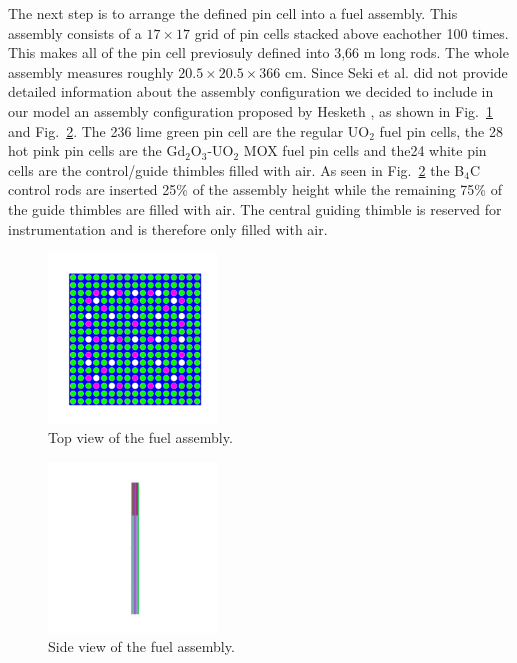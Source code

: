 \documentclass[twocolumn,a4paper,10pt]{article}
\begin{document}
\par
The next step is to arrange the defined pin cell into a fuel assembly. This assembly consists of a $17 \times 17$ grid of pin cells stacked above eachother 100 times. This makes all of the pin cell previosuly defined into 3,66 m long rods. The whole assembly measures roughly $20.5 \times 20.5 \times 366$ cm. Since Seki et al. \cite{APWR} did not provide detailed information about the assembly configuration we decided to include in our model an assembly configuration proposed by Hesketh \cite{BurnupFuel}, as shown in Fig.~\ref{fig:fuelass_xy} and Fig.~\ref{fig:fuelass_yz}. The 236 lime green pin cell are the regular UO$_2$ fuel pin cells, the 28 hot pink pin cells are the Gd$_2$O$_3$-UO$_2$ MOX fuel pin cells and the24  white pin cells are the control/guide thimbles filled with air. As seen in Fig.~\ref{fig:fuelass_yz} the B$_4$C control rods are inserted 25\% of the assembly height while the remaining 75\% of the guide thimbles are filled with air. The central guiding thimble is reserved for instrumentation and is therefore only filled with air. 

\begin{figure}[ht]
  \centering
  \includegraphics[width=0.4\textwidth]{../Pictures/f_Assembly_Universe_plot_xy.png}
  \caption{Top view of the fuel assembly.}
  \label{fig:fuelass_xy}
\end{figure}

\begin{figure}[ht]
  \centering
  \includegraphics[width=0.4\textwidth]{../Pictures/f_Assembly_Universe_plot_yz.png}
  \caption{Side view of the fuel assembly.}
  \label{fig:fuelass_yz}
\end{figure}
\end{document}
